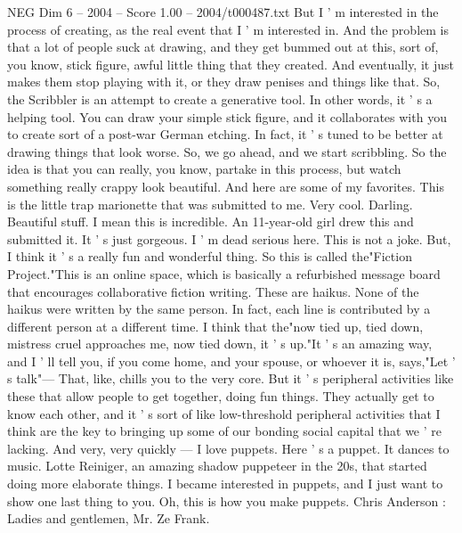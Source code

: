 \begin{textsample}{NEG Dim 6 – 2004 – Score 1.00 – 2004/t000487.txt}
But I ' m interested in the process of creating, as the real event that I ' m interested in.
And the problem is that a lot of people suck at drawing, and they get bummed out at this, sort of, you know, stick figure, awful little thing that they created.
And eventually, it just makes them stop playing with it, or they draw penises and things like that.
So, the Scribbler is an attempt to create a generative tool.
In other words, it ' s a helping tool.
You can draw your simple stick figure, and it collaborates with you to create sort of a post-war German etching.
In fact, it ' s tuned to be better at drawing things that look worse.
So, we go ahead, and we start scribbling.
So the idea is that you can really, you know, partake in this process, but watch something really crappy look beautiful.
And here are some of my favorites.
This is the little trap marionette that was submitted to me.
Very cool.
Darling.
Beautiful stuff.
I mean this is incredible.
An 11-year-old girl drew this and submitted it.
It ' s just gorgeous.
I ' m dead serious here.
This is not a joke.
But, I think it ' s a really fun and wonderful thing.
So this is called the"Fiction Project."This is an online space, which is basically a refurbished message board that encourages collaborative fiction writing.
These are haikus.
None of the haikus were written by the same person.
In fact, each line is contributed by a different person at a different time.
I think that the"now tied up, tied down, mistress cruel approaches me, now tied down, it ' s up."It ' s an amazing way, and I ' ll tell you, if you come home, and your spouse, or whoever it is, says,"Let ' s talk"— That, like, chills you to the very core.
But it ' s peripheral activities like these that allow people to get together, doing fun things.
They actually get to know each other, and it ' s sort of like low-threshold peripheral activities that I think are the key to bringing up some of our bonding social capital that we ' re lacking.
And very, very quickly — I love puppets.
Here ' s a puppet.
It dances to music.
Lotte Reiniger, an amazing shadow puppeteer in the 20s, that started doing more elaborate things.
I became interested in puppets, and I just want to show one last thing to you.
Oh, this is how you make puppets.
Chris Anderson : Ladies and gentlemen, Mr.
Ze Frank.

\end{textsample}
